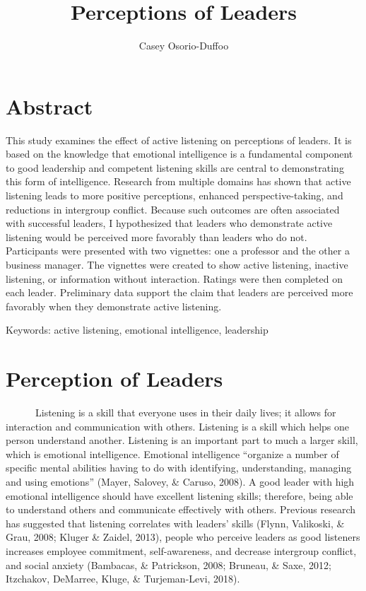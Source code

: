 \documentclass[
  12pt,
]{article}
\title{Perceptions of Leaders}
\author{Casey Osorio-Duffoo}
\date{}
\begin{document}
\maketitle

{
\setcounter{tocdepth}{2}
\tableofcontents
}
\newpage

\hypertarget{abstract}{%
\section{Abstract}\label{abstract}}

This study examines the effect of active listening on perceptions of leaders. It is based on the knowledge that emotional intelligence is a fundamental component to good leadership and competent listening skills are central to demonstrating this form of intelligence. Research from multiple domains has shown that active listening leads to more positive perceptions, enhanced perspective-taking, and reductions in intergroup conflict. Because such outcomes are often associated with successful leaders, I hypothesized that leaders who demonstrate active listening would be perceived more favorably than leaders who do not. Participants were presented with two vignettes: one a professor and the other a business manager. The vignettes were created to show active listening, inactive listening, or information without interaction. Ratings were then completed on each leader. Preliminary data support the claim that leaders are perceived more favorably when they demonstrate active listening.

Keywords: active listening, emotional intelligence, leadership
\newpage

\hypertarget{perception-of-leaders}{%
\section{Perception of Leaders}\label{perception-of-leaders}}

~~~~~~Listening is a skill that everyone uses in their daily lives; it allows for interaction and communication with others. Listening is a skill which helps one person understand another. Listening is an important part to much a larger skill, which is emotional intelligence. Emotional intelligence ``organize a number of specific mental abilities having to do with identifying, understanding, managing and using emotions'' (Mayer, Salovey, \& Caruso, 2008). A good leader with high emotional intelligence should have excellent listening skills; therefore, being able to understand others and communicate effectively with others. Previous research has suggested that listening correlates with leaders' skills (Flynn, Valikoski, \& Grau, 2008; Kluger \& Zaidel, 2013), people who perceive leaders as good listeners increases employee commitment, self-awareness, and decrease intergroup conflict, and social anxiety (Bambacas, \& Patrickson, 2008; Bruneau, \& Saxe, 2012; Itzchakov, DeMarree, Kluge, \& Turjeman-Levi, 2018).
\end{document}
